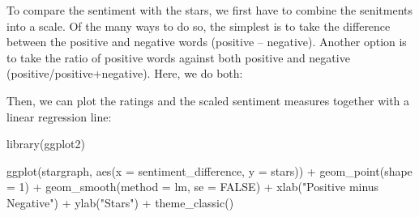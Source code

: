 \documentclass[
]{book}
\newenvironment{Shaded}{\begin{snugshade}}{\end{snugshade}}
\newcommand{\AttributeTok}[1]{\textcolor[rgb]{0.77,0.63,0.00}{#1}}
\newcommand{\ConstantTok}[1]{\textcolor[rgb]{0.00,0.00,0.00}{#1}}
\newcommand{\DecValTok}[1]{\textcolor[rgb]{0.00,0.00,0.81}{#1}}
\newcommand{\FunctionTok}[1]{\textcolor[rgb]{0.00,0.00,0.00}{#1}}
\newcommand{\NormalTok}[1]{#1}
\newcommand{\OtherTok}[1]{\textcolor[rgb]{0.56,0.35,0.01}{#1}}
\newcommand{\SpecialCharTok}[1]{\textcolor[rgb]{0.00,0.00,0.00}{#1}}
\newcommand{\StringTok}[1]{\textcolor[rgb]{0.31,0.60,0.02}{#1}}
\begin{document}
\begin{Shaded}
\end{Shaded}

To compare the sentiment with the stars, we first have to combine the senitments into a scale. Of the many ways to do so, the simplest is to take the difference between the positive and negative words (positive -- negative). Another option is to take the ratio of positive words against both positive and negative (positive/positive+negative). Here, we do both:

\begin{Shaded}
\end{Shaded}

Then, we can plot the ratings and the scaled sentiment measures together with a linear regression line:

\begin{Shaded}
\begin{Highlighting}[]
\FunctionTok{library}\NormalTok{(ggplot2)}

\FunctionTok{ggplot}\NormalTok{(stargraph, }\FunctionTok{aes}\NormalTok{(}\AttributeTok{x =}\NormalTok{ sentiment\_difference, }\AttributeTok{y =}\NormalTok{ stars)) }\SpecialCharTok{+} 
    \FunctionTok{geom\_point}\NormalTok{(}\AttributeTok{shape =} \DecValTok{1}\NormalTok{) }\SpecialCharTok{+} \FunctionTok{geom\_smooth}\NormalTok{(}\AttributeTok{method =}\NormalTok{ lm, }\AttributeTok{se =} \ConstantTok{FALSE}\NormalTok{) }\SpecialCharTok{+} 
    \FunctionTok{xlab}\NormalTok{(}\StringTok{"Positive minus Negative"}\NormalTok{) }\SpecialCharTok{+} \FunctionTok{ylab}\NormalTok{(}\StringTok{"Stars"}\NormalTok{) }\SpecialCharTok{+} \FunctionTok{theme\_classic}\NormalTok{()}
\end{Highlighting}
\end{Shaded}
\end{document}
